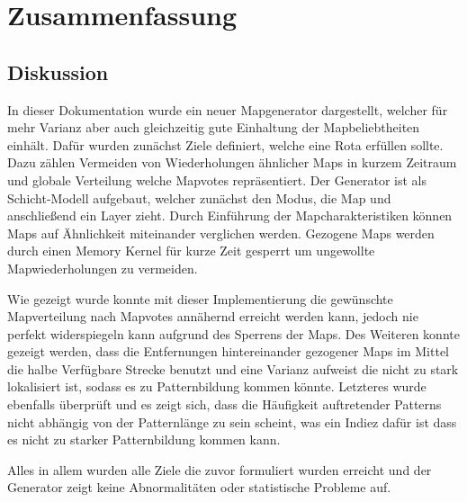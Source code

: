 \section{Zusammenfassung}
    \subsection{Diskussion}
    	In dieser Dokumentation wurde ein neuer Mapgenerator dargestellt, welcher für mehr Varianz aber auch gleichzeitig gute Einhaltung der Mapbeliebtheiten einhält.
        Dafür wurden zunächst Ziele definiert, welche eine Rota erfüllen sollte. 
        Dazu zählen Vermeiden von Wiederholungen ähnlicher Maps in kurzem Zeitraum und globale Verteilung welche Mapvotes repräsentiert.
        Der Generator ist als Schicht-Modell aufgebaut, welcher zunächst den Modus, die Map und anschließend ein Layer zieht. 
        Durch Einführung der Mapcharakteristiken können Maps auf Ähnlichkeit miteinander verglichen werden.
        Gezogene Maps werden durch einen Memory Kernel für kurze Zeit gesperrt um ungewollte Mapwiederholungen zu vermeiden.
        
        Wie gezeigt wurde konnte mit dieser Implementierung die gewünschte Mapverteilung nach Mapvotes annähernd erreicht werden kann, 
        jedoch nie perfekt widerspiegeln kann aufgrund des Sperrens der Maps.
        Des Weiteren konnte gezeigt werden,
        dass die Entfernungen hintereinander gezogener Maps im Mittel die halbe Verfügbare Strecke benutzt und eine Varianz aufweist die nicht zu stark lokalisiert ist, 
        sodass es zu Patternbildung kommen könnte.
        Letzteres wurde ebenfalls überprüft und es zeigt sich, 
        dass die Häufigkeit auftretender Patterns nicht abhängig von der Patternlänge zu sein scheint, was ein Indiez dafür ist dass es nicht zu starker Patternbildung kommen kann. 

        Alles in allem wurden alle Ziele die zuvor formuliert wurden erreicht und der Generator zeigt keine Abnormalitäten oder statistische Probleme auf.

